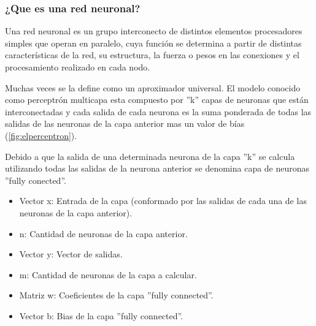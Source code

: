 \begin{figure}[!h]
\centering
 
\label{fig:elperceptron}
\end{figure}

\subsubsection{¿Que es una red neuronal?}

Una red neuronal es un grupo interconecto de distintos elementos procesadores simples que operan en paralelo, cuya función se determina a partir de distintas características de la red, su estructura, la fuerza o pesos en las conexiones y el procesamiento realizado en cada nodo.\par
Muchas veces se la define como un aproximador universal. El modelo conocido como perceptrón multicapa esta compuesto por ''k'' capas de neuronas que están interconectadas y cada salida de cada neurona es la suma ponderada de todas las salidas de las neuronas de la capa anterior mas un valor de bías (\autoref{fig:elperceptron}).

\begin{figure}[!h]
\centering
 
\label{fig:elperceptronmulticapa}
\end{figure}

Debido a que la salida de una determinada neurona de la capa ''k'' se calcula utilizando todas las salidas de la neurona anterior se denomina capa de neuronas ''fully conected''.\par

\begin{itemize}
    \item Vector x: Entrada de la capa (conformado por las salidas de cada una de las neuronas de la capa anterior).
    \item n: Cantidad de neuronas de la capa anterior.
    \item Vector y: Vector de salidas.
    \item m: Cantidad de neuronas de la capa a calcular.
    \item Matriz w: Coeficientes de la capa ''fully connected''.
    \item Vector b: Bias de la capa ''fully connected''.
\end{itemize}



